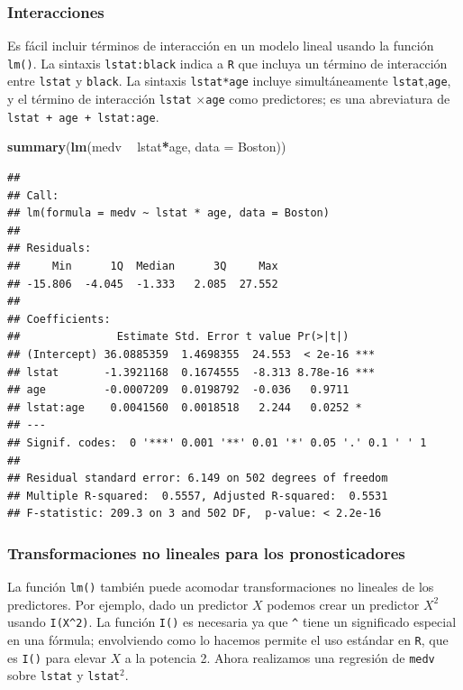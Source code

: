 \documentclass[]{book}
\newenvironment{Shaded}{\begin{snugshade}}{\end{snugshade}}
\newcommand{\KeywordTok}[1]{\textcolor[rgb]{0.13,0.29,0.53}{\textbf{#1}}}
\newcommand{\DataTypeTok}[1]{\textcolor[rgb]{0.13,0.29,0.53}{#1}}
\newcommand{\StringTok}[1]{\textcolor[rgb]{0.31,0.60,0.02}{#1}}
\newcommand{\OperatorTok}[1]{\textcolor[rgb]{0.81,0.36,0.00}{\textbf{#1}}}
\newcommand{\NormalTok}[1]{#1}
\begin{document}
\subsubsection{Interacciones}\label{interacciones}

Es fácil incluir términos de interacción en un modelo lineal usando la
función \texttt{lm()}. La sintaxis \texttt{lstat:black} indica a
\texttt{R} que incluya un término de interacción entre \texttt{lstat} y
\texttt{black}. La sintaxis \texttt{lstat*age} incluye simultáneamente
\texttt{lstat},\texttt{age}, y el término de interacción \texttt{lstat}
\(\times\)\texttt{age} como predictores; es una abreviatura de
\texttt{lstat\ +\ age\ +\ lstat:age}.

\begin{Shaded}
\begin{Highlighting}[]
\KeywordTok{summary}\NormalTok{(}\KeywordTok{lm}\NormalTok{(medv }\OperatorTok{~}\StringTok{ }\NormalTok{lstat}\OperatorTok{*}\NormalTok{age, }\DataTypeTok{data =}\NormalTok{ Boston))}
\end{Highlighting}
\end{Shaded}

\begin{verbatim}
## 
## Call:
## lm(formula = medv ~ lstat * age, data = Boston)
## 
## Residuals:
##     Min      1Q  Median      3Q     Max 
## -15.806  -4.045  -1.333   2.085  27.552 
## 
## Coefficients:
##               Estimate Std. Error t value Pr(>|t|)    
## (Intercept) 36.0885359  1.4698355  24.553  < 2e-16 ***
## lstat       -1.3921168  0.1674555  -8.313 8.78e-16 ***
## age         -0.0007209  0.0198792  -0.036   0.9711    
## lstat:age    0.0041560  0.0018518   2.244   0.0252 *  
## ---
## Signif. codes:  0 '***' 0.001 '**' 0.01 '*' 0.05 '.' 0.1 ' ' 1
## 
## Residual standard error: 6.149 on 502 degrees of freedom
## Multiple R-squared:  0.5557, Adjusted R-squared:  0.5531 
## F-statistic: 209.3 on 3 and 502 DF,  p-value: < 2.2e-16
\end{verbatim}

\subsubsection{Transformaciones no lineales para los
pronosticadores}\label{transformaciones-no-lineales-para-los-pronosticadores}

La función \texttt{lm()} también puede acomodar transformaciones no
lineales de los predictores. Por ejemplo, dado un predictor \(X\)
podemos crear un predictor \(X^2\) usando \texttt{I(X\^{}2)}. La función
\texttt{I()} es necesaria ya que \texttt{\^{}} tiene un significado
especial en una fórmula; envolviendo como lo hacemos permite el uso
estándar en \texttt{R}, que es \texttt{I()} para elevar \(X\) a la
potencia 2. Ahora realizamos una regresión de \texttt{medv} sobre
\texttt{lstat} y \texttt{lstat}\(^2\).
\end{document}

